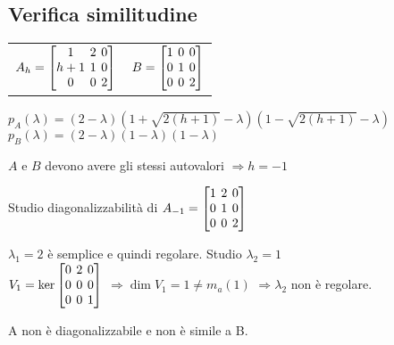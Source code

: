 \subsection{Verifica similitudine}
\begin{tabular}{cc}
	$
	A_h = \left[
		\arraycolsep=2.0pt\def\arraystretch{1.0}
		\begin{array}{@{}ccc@{}}
			1   & 2 & 0 \\
			h+1 & 1 & 0 \\
			0   & 0 & 2 \\
		\end{array}
	\right]
	$ &
	$
	B = \left[
		\arraycolsep=2.0pt\def\arraystretch{1.0}
		\begin{array}{@{}ccc@{}}
			1 & 0 & 0 \\
			0 & 1 & 0 \\
			0 & 0 & 2 \\
		\end{array}
	\right]
	$
\end{tabular}

$p_A(\lambda) = (2-\lambda)(1+\sqrt{2(h+1)}-\lambda)(1-\sqrt{2(h+1)}-\lambda)$
$p_B(\lambda) = (2-\lambda)(1-\lambda)(1-\lambda)$

$A$ e $B$ devono avere gli stessi autovalori $\Rightarrow h = -1$

Studio diagonalizzabilità di $A_{-1} =
\left[
	\arraycolsep=2.0pt\def\arraystretch{1.0}
	\begin{array}{@{}ccc@{}}
		1 & 2 & 0 \\
		0 & 1 & 0 \\
		0 & 0 & 2 \\
	\end{array}
\right]
$

$\lambda_1 = 2$ è semplice e quindi regolare. Studio $\lambda_2 = 1$ \\
$V_1 = \ker 
\left[
	\arraycolsep=2.0pt\def\arraystretch{1.0}
	\begin{array}{@{}ccc@{}}
		0 & 2 & 0 \\
		0 & 0 & 0 \\
		0 & 0 & 1 \\
	\end{array}
\right]
$
$\Rightarrow \dim V_1 = 1 \neq m_a(1)$
$\Rightarrow \lambda_2$ non è regolare.

A non è diagonalizzabile e non è simile a B.
